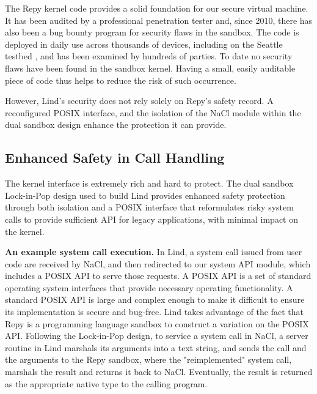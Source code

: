 The Repy kernel code provides a solid foundation for our secure virtual
machine. It has been audited by a professional penetration tester and, since 2010,
there has also been a bug bounty program for security flaws in the sandbox.
The code is deployed in daily use across thousands of devices,
including on the Seattle testbed \cite{seattle}, and has been examined by
hundreds of parties. To date no security flaws have been found in the sandbox
kernel. Having a small, easily auditable piece of code thus helps to reduce the
risk of such occurrence.

However, Lind's security does not rely solely on Repy's
safety record. A reconfigured POSIX interface, and the isolation of
the NaCl module within the dual sandbox design enhance the protection it can
provide.

\subsection{Enhanced Safety in Call Handling}

The kernel interface is extremely rich and hard to protect.
The dual sandbox Lock-in-Pop design used to build Lind provides enhanced
safety protection through both isolation and a POSIX interface that
reformulates risky system calls to
provide sufficient API for legacy applications, with minimal impact on the kernel.

\textbf{An example system call execution.}
In Lind, a system call issued from user code are
received by NaCl, and then redirected to our system API module, which
includes a POSIX API to serve those requests. A POSIX API is a set of standard
operating system interfaces that provide
necessary operating functionality. A standard POSIX API is large and complex
enough to make it difficult to ensure its implementation is secure and bug-free.
Lind takes advantage of the fact that Repy is a programming language sandbox to
construct a variation on the POSIX API. Following the
Lock-in-Pop design, to service a system call in NaCl, a server routine in
Lind marshals its arguments into a text string, and sends the call and the arguments
to the Repy sandbox, where the "reimplemented" system call, marshals the result and
returns it back to NaCl. Eventually, the result is returned as the appropriate
native type to the calling program.


